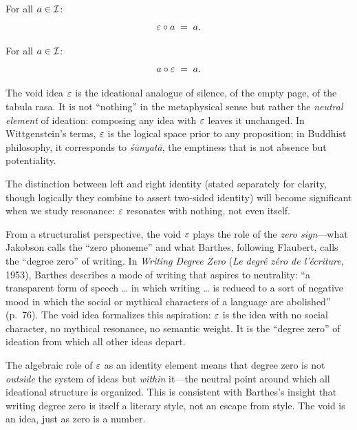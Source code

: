 \begin{axiom_def}
For all $a \in \mathcal{I}$:
\[
    \varepsilon \circ a \;=\; a.
\]
\end{axiom_def}

\begin{axiom_def}
For all $a \in \mathcal{I}$:
\[
    a \circ \varepsilon \;=\; a.
\]
\end{axiom_def}

\begin{interpretation}
The void idea $\varepsilon$ is the ideational analogue of silence, of the empty
page, of the tabula rasa. It is not ``nothing'' in the metaphysical sense
but rather the \emph{neutral element} of ideation: composing any idea with
$\varepsilon$ leaves it unchanged. In Wittgenstein's terms, $\varepsilon$ is the
logical space prior to any proposition; in Buddhist philosophy, it
corresponds to \emph{\'{s}\={u}nyat\={a}}, the emptiness that is not
absence but potentiality.

The distinction between left and right identity (stated separately for
clarity, though logically they combine to assert two-sided identity) will
become significant when we study resonance: $\varepsilon$ resonates with nothing,
not even itself.
\end{interpretation}

\begin{remark}\label{rem:ch1:void_structuralist}
From a structuralist perspective, the void $\varepsilon$ plays the role of the
\emph{zero sign}---what Jakobson calls the ``zero phoneme'' and what
Barthes, following Flaubert, calls the ``degree zero'' of writing. In
\emph{Writing Degree Zero} (\emph{Le degr\'e z\'ero de l'\'ecriture},
1953), Barthes describes a mode of writing that aspires to neutrality:
``a transparent form of speech \ldots{} in which writing \ldots{} is reduced
to a sort of negative mood in which the social or mythical characters of a
language are abolished'' (p.~76). The void idea formalizes this aspiration:
$\varepsilon$ is the idea with no social character, no mythical resonance, no
semantic weight. It is the ``degree zero'' of ideation from which all
other ideas depart.

The algebraic role of $\varepsilon$ as an identity element means that degree zero
is not \emph{outside} the system of ideas but \emph{within} it---the
neutral point around which all ideational structure is organized. This is
consistent with Barthes's insight that writing degree zero is itself a
literary style, not an escape from style. The void is an idea, just as
zero is a number.
\end{remark}

